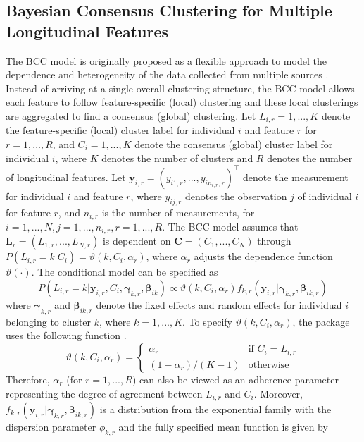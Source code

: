 \subsection{Bayesian Consensus Clustering for Multiple Longitudinal Features}
The BCC model is originally proposed as a flexible approach to model the dependence and heterogeneity of the data collected from multiple sources \citep{Lock2013}. Instead of arriving at a single overall clustering structure, the BCC model allows each feature to follow feature-specific (local) clustering and these local clusterings are aggregated to find a consensus (global) clustering.
Let $L_{i,r} = 1,...,K$ denote the feature-specific (local) cluster label for individual $i$ and feature $r$ for $r=1,...,R$, and $C_i = 1,...,K$ denote the consensus (global) cluster label for individual $i$, where $K$ denotes the number of clusters and $R$ denotes the number of longitudinal features. Let $\boldsymbol{y}_{i,r} = (y_{i1,r}, ..., y_{in_{i,r},r})^\top$ denote the measurement for individual $i$ and feature $r$, where $y_{ij,r}$ denotes the observation $j$ of individual $i$ for feature $r$, and $n_{i,r}$ is the number of measurements, for $i=1,...,N, j=1,...,n_{i,r}, r=1,...,R$.
The BCC model assumes that $\boldsymbol{L}_{r} = (L_{1,r},...,L_{N,r})$ is dependent on $\boldsymbol{C} = (C_1,...,C_N)$ through $P(L_{i,r}=k|C_i) = \vartheta(k,C_i, \alpha_r)$, where $\alpha_r$ adjusts the dependence function $\vartheta(\cdot)$. The conditional model can be specified as 
\begin{equation}
P(L_{i,r}=k|\boldsymbol{y}_{i,r},C_i,\boldsymbol{\gamma}_{k,r}, \boldsymbol{\beta}_{ik}) \propto\vartheta(k,C_i,\alpha_r)f_{k,r}(\boldsymbol{y}_{i,r}|\boldsymbol{\gamma}_{k,r}, \boldsymbol{\beta}_{ik,r})
\end{equation}
where $\boldsymbol{\gamma}_{k,r}$ and $\boldsymbol{\beta}_{ik,r}$ denote the fixed effects and random effects for individual $i$ belonging to cluster $k$, where $k=1,...,K$. To specify $\vartheta(k,C_i,\alpha_r)$, the package uses the following function \citep{Lock2013}. 
\begin{equation}
  \vartheta(k,C_i,\alpha_r)  =
    \begin{cases}
      \alpha_r & \text{if } C_i = L_{i,r}\\
      (1- \alpha_r)/(K-1) & \text{otherwise}
    \end{cases}       
\end{equation}
Therefore, $\alpha_r$ (for $r = 1,...,R$) can also be viewed as an adherence parameter representing the degree of agreement between $L_{i,r}$ and $C_i$. Moreover, $ f_{k,r}(\boldsymbol{y}_{i,r}|\boldsymbol{\gamma}_{k,r}, \boldsymbol{\beta}_{ik,r})$ is a distribution from the exponential family with the dispersion parameter $\phi_{k,r}$ and the fully specified mean function is given by 
